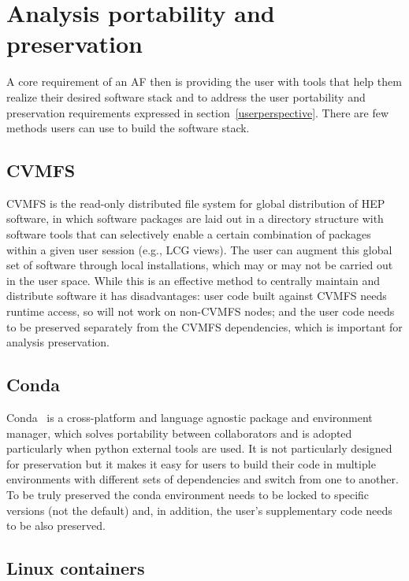 \section{Analysis portability and preservation}
\label{preservation}

A core requirement of an AF then is providing the user with tools that help them realize their desired software stack and to address the user portability and preservation requirements expressed in section~\ref{userperspective}. There are few methods users can use to build the software stack.

\subsection*{CVMFS}
CVMFS is the read-only distributed file system for global distribution of HEP software, in which software packages are laid out in a directory structure with software tools that can selectively enable a certain combination of packages within a given user session (e.g., LCG views). The user can augment this global set of software through local installations, which may or may not be carried out in the user space. While this is an effective method to centrally maintain and distribute software it has disadvantages: user code built against CVMFS needs runtime access, so will not work on non-CVMFS nodes; and the user code needs to be preserved separately from the CVMFS dependencies, which is important for analysis preservation.

\subsection*{Conda}

Conda~\cite{conda} is a cross-platform and language agnostic package and environment manager, which solves portability between collaborators and is adopted particularly when python external tools are used. It is not particularly designed for preservation but it makes it easy for users to build their code in multiple environments with different sets of dependencies and switch from one to another. To be truly preserved the conda environment needs to be locked to specific versions (not the default) and, in addition, the user’s supplementary code needs to be also preserved.

\subsection*{Linux containers}

